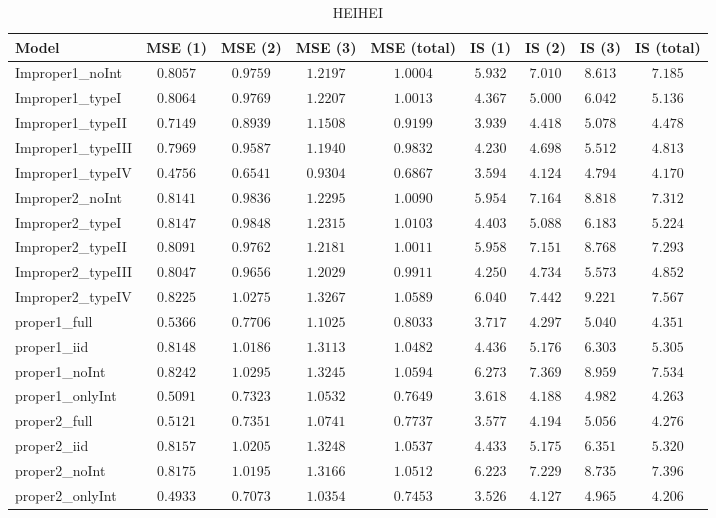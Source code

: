 \begin{table}

\caption{\label{tab:model-choice-sc8}HEIHEI}
\centering
\begin{tabular}{lcccccccc}
\hline
Model  & MSE (1) & MSE (2) & MSE (3) & MSE (total) & IS (1) & IS (2) & IS (3) & \multicolumn{1}{c}{IS (total)} \\ 
\hline
Improper1_noInt  & $0.8057$ & $0.9759$ & $1.2197$ & $1.0004$ & $5.932$ & $7.010$ & $8.613$ & $7.185$ \\
Improper1_typeI  & $0.8064$ & $0.9769$ & $1.2207$ & $1.0013$ & $4.367$ & $5.000$ & $6.042$ & $5.136$ \\
Improper1_typeII  & $0.7149$ & $0.8939$ & $1.1508$ & $0.9199$ & $3.939$ & $4.418$ & $5.078$ & $4.478$ \\
Improper1_typeIII  & $0.7969$ & $0.9587$ & $1.1940$ & $0.9832$ & $4.230$ & $4.698$ & $5.512$ & $4.813$ \\
Improper1_typeIV  & $0.4756$ & $0.6541$ & $0.9304$ & $0.6867$ & $3.594$ & $4.124$ & $4.794$ & $4.170$ \\
Improper2_noInt  & $0.8141$ & $0.9836$ & $1.2295$ & $1.0090$ & $5.954$ & $7.164$ & $8.818$ & $7.312$ \\
Improper2_typeI  & $0.8147$ & $0.9848$ & $1.2315$ & $1.0103$ & $4.403$ & $5.088$ & $6.183$ & $5.224$ \\
Improper2_typeII  & $0.8091$ & $0.9762$ & $1.2181$ & $1.0011$ & $5.958$ & $7.151$ & $8.768$ & $7.293$ \\
Improper2_typeIII  & $0.8047$ & $0.9656$ & $1.2029$ & $0.9911$ & $4.250$ & $4.734$ & $5.573$ & $4.852$ \\
Improper2_typeIV  & $0.8225$ & $1.0275$ & $1.3267$ & $1.0589$ & $6.040$ & $7.442$ & $9.221$ & $7.567$ \\
proper1_full  & $0.5366$ & $0.7706$ & $1.1025$ & $0.8033$ & $3.717$ & $4.297$ & $5.040$ & $4.351$ \\
proper1_iid  & $0.8148$ & $1.0186$ & $1.3113$ & $1.0482$ & $4.436$ & $5.176$ & $6.303$ & $5.305$ \\
proper1_noInt  & $0.8242$ & $1.0295$ & $1.3245$ & $1.0594$ & $6.273$ & $7.369$ & $8.959$ & $7.534$ \\
proper1_onlyInt  & $0.5091$ & $0.7323$ & $1.0532$ & $0.7649$ & $3.618$ & $4.188$ & $4.982$ & $4.263$ \\
proper2_full  & $0.5121$ & $0.7351$ & $1.0741$ & $0.7737$ & $3.577$ & $4.194$ & $5.056$ & $4.276$ \\
proper2_iid  & $0.8157$ & $1.0205$ & $1.3248$ & $1.0537$ & $4.433$ & $5.175$ & $6.351$ & $5.320$ \\
proper2_noInt  & $0.8175$ & $1.0195$ & $1.3166$ & $1.0512$ & $6.223$ & $7.229$ & $8.735$ & $7.396$ \\
proper2_onlyInt  & $0.4933$ & $0.7073$ & $1.0354$ & $0.7453$ & $3.526$ & $4.127$ & $4.965$ & $4.206$ \\
\hline 
\end{tabular}


\end{table}